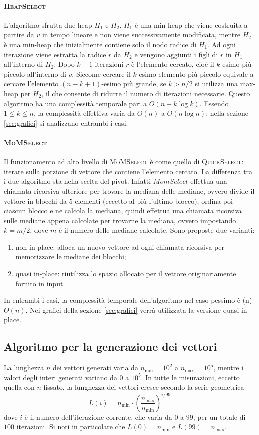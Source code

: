 \documentclass[a4paper,12pt]{article}
\newcommand{\QuickSelect}{\textsc{QuickSelect}}
\newcommand{\HeapSelect}{\textsc{HeapSelect}}
\newcommand{\MoMSelect}{\textsc{MoMSelect}}
\newcommand{\Tlin}{\ifmmode \Theta(n) \else $\Theta(n)$\fi} %
\begin{document}
\paragraph{\HeapSelect}
L'algoritmo sfrutta due heap $H_1$ e $H_2$.
$H_1$ è una min-heap che viene costruita a partire da $v$ in tempo lineare e non viene successivamente modificata, mentre $H_2$ è una min-heap che inizialmente contiene solo il nodo radice di $H_1$.
Ad ogni iterazione viene estratta la radice $r$ da $H_2$ e vengono aggiunti i figli di $r$ in $H_1$ all'interno di $H_2$.
Dopo $k-1$ iterazioni $r$ è l'elemento cercato, cioè il $k$-esimo più piccolo all'interno di $v$.
Siccome cercare il $k$-esimo elemento più piccolo equivale a cercare l'elemento $(n-k+1)$-esimo più grande, se $k>n/2$ si utilizza una max-heap per $H_2$, il che consente di ridurre il numero di iterazioni necessarie.
Questo algoritmo ha una complessità temporale pari a $O(n+k\log k)$.
Essendo $1 \le k \le n$, la complessità effettiva varia da $O(n)$ a $O(n\log n)$; nella sezione \ref{sec:grafici} si analizzano entrambi i casi.

\paragraph{\MoMSelect}
Il funzionamento ad alto livello di \MoMSelect{} è come quello di \QuickSelect: iterare sulla porzione di vettore che contiene l'elemento cercato.
La differenza tra i due algoritmo sta nella scelta del pivot.
Infatti $MomSelect$ effettua una chiamata ricorsiva ulteriore per trovare la mediana delle mediane, ovvero divide il vettore in blocchi da $5$ elementi (eccetto al più l'ultimo blocco), ordina poi ciascun blocco e ne calcola la mediana, quindi effettua una chiamata ricorsiva sulle mediane appena calcolate per trovarne la mediana, ovvero impostando $k=m/2$, dove $m$ è il numero delle mediane calcolate.
Sono proposte due varianti:
\begin{enumerate}
    \item non in-place: alloca un nuovo vettore ad ogni chiamata ricorsiva per memorizzare le mediane dei blocchi;
    \item quasi in-place: riutilizza lo spazio allocato per il vettore originariamente fornito in input.
\end{enumerate}
In entrambi i casi, la complessità temporale dell'algoritmo nel caso pessimo è \Tlin{}.
Nei grafici della sezione \ref{sec:grafici} verrà utilizzata la versione quasi in-place.


\subsection{Algoritmo per la generazione dei vettori}
La lunghezza $n$ dei vettori generati varia da $n_{\min}=10^2$ a $n_{\max}=10^5$, mentre i valori degli interi generati variano da $0$ a $10^5$.
In tutte le misurazioni, eccetto quella con $n$ fissato, la lunghezza dei vettori cresce secondo la serie geometrica
\[
    L(i) = n_{\min} \cdot \left(\frac{n_{\max}}{n_{\min}}\right)^{i/99}
\]
dove $i$ è il numero dell'iterazione corrente, che varia da $0$ a $99$, per un totale di $100$ iterazioni.
Si noti in particolare che $L(0) = n_{\min}$ e $L(99) = n_{\max}$.
\end{document}
